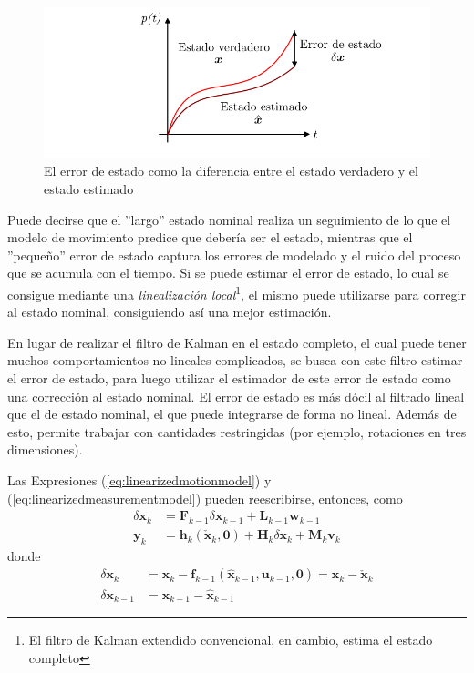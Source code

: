 \begin{figure}[!ht]
    \centering
    \includegraphics[width=\textwidth]{Img/ErrorState.png}
    \caption{El error de estado como la diferencia entre el estado verdadero y el estado estimado}
    \label{fig:errorstate}
\end{figure}

Puede decirse que el ''largo'' estado nominal realiza un seguimiento de lo que el modelo de movimiento predice que debería ser el estado, mientras que el ''pequeño'' error de estado captura los errores de modelado y el ruido del proceso que se acumula con el tiempo. Si se puede estimar el error de estado, lo cual se consigue mediante una \textit{linealización local}\footnote{El filtro de Kalman extendido convencional, en cambio, estima el estado completo}, el mismo puede utilizarse para corregir al estado nominal, consiguiendo así una mejor estimación.

En lugar de realizar el filtro de Kalman en el estado completo, el cual puede tener muchos comportamientos no lineales complicados, se busca con este filtro estimar el error de estado, para luego utilizar el estimador de este error de estado como una corrección al estado nominal. El error de estado es más dócil al filtrado lineal que el de estado nominal, el que puede integrarse de forma no lineal. Además de esto, permite trabajar con cantidades restringidas (por ejemplo, rotaciones en tres dimensiones).

Las Expresiones (\ref{eq:linearizedmotionmodel}) y (\ref{eq:linearizedmeasurementmodel}) pueden reescribirse, entonces, como
\begin{align}
    \delta \bm{x}_k &= \bm{F}_{k-1}\delta\bm{x}_{k-1} + \bm{L}_{k-1}\bm{w}_{k-1} \\
    \bm{y}_k &= \bm{h}_k(\check{\bm{x}}_k,\bm{0}) + \bm{H}_k\delta\bm{x}_k + \bm{M}_k\bm{v}_k 
\end{align}
donde
\begin{align}
    \delta \bm{x}_k &= \bm{x}_k - \bm{f}_{k-1}(\hat{\bm{x}}_{k-1},\bm{u}_{k-1},\bm{0}) = \bm{x}_k - \check{\bm{x}}_k \\
    \delta\bm{x}_{k-1} &= \bm{x}_{k-1} - \hat{\bm{x}}_{k-1}
\end{align}

